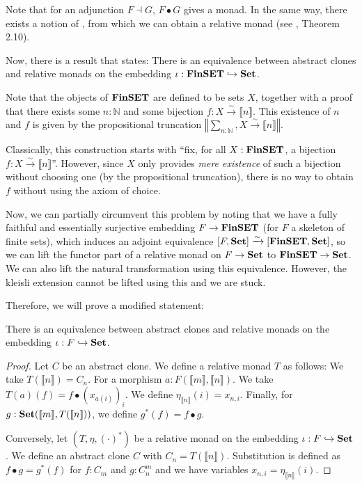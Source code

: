 \begin{remark}
  Note that for an adjunction $ F \dashv G $, $ F \bullet G $ gives a monad. In the same way, there exists a notion of , from which we can obtain a relative monad (see \autocite{monads-endofunctors}, Theorem 2.10).
\end{remark}

\begin{remark}
  Now, there is a result that states: There is an equivalence between abstract clones and relative monads on the embedding $ \iota: \mathbf{FinSET} \hookrightarrow \mathbf{Set} $.

  Note that the objects of $ \mathbf{FinSET} $ are defined to be sets $ X $, together with a proof that there exists some $ n: \mathbb N $ and some bijection $ f: X \xrightarrow{\sim} \llbracket n \rrbracket $. This existence of $ n $ and $ f $ is given by the propositional truncation $ \left\Vert \sum_{n: \mathbb N}, X \xrightarrow{\sim} \llbracket n \rrbracket \right\Vert $.

  Classically, this construction starts with ``fix, for all $ X : \mathbf{FinSET} $, a bijection $ f: X \xrightarrow{\sim} \llbracket n \rrbracket $''. However, since $ X $ only provides \textit{mere existence} of such a bijection without choosing one (by the propositional truncation), there is no way to obtain $ f $ without using the axiom of choice.

  Now, we can partially circumvent this problem by noting that we have a fully faithful and essentially surjective embedding $ F \to \mathbf{FinSET} $ (for $ F $ a skeleton of finite sets), which induces an adjoint equivalence $ [F, \mathbf{Set}] \xrightarrow{\sim} [\mathbf{FinSET}, \mathbf{Set}] $, so we can lift the functor part of a relative monad on $ F \to \mathbf{Set} $ to $ \mathbf{FinSET} \to \mathbf{Set} $. We can also lift the natural transformation using this equivalence. However, the kleisli extension cannot be lifted using this and we are stuck.

  Therefore, we will prove a modified statement:
\end{remark}

\begin{lemma}
  There is an equivalence between abstract clones and relative monads on the embedding $ \iota: F \hookrightarrow \mathbf{Set} $.
\end{lemma}
\begin{proof}
  Let $ C $ be an abstract clone. We define a relative monad $ T $ as follows: We take $ T(\llbracket n \rrbracket) = C_n $. For a morphism $ a: F(\llbracket m \rrbracket, \llbracket n \rrbracket) $. We take $ T(a)(f) = f \bullet (x_{a(i)})_i $. We define $ \eta_{\llbracket n \rrbracket}(i) = x_{n, i} $. Finally, for $ g: \mathbf{Set}(\llbracket m \rrbracket, T(\llbracket n \rrbracket)) $, we define $ g^*(f) = f \bullet g $.

  Conversely, let $ (T, \eta, (\cdot)^*) $ be a relative monad on the embedding $ \iota: F \hookrightarrow \mathbf{Set} $. We define an abstract clone $ C $ with $ C_n = T(\llbracket n \rrbracket) $. Substitution is defined as $ f \bullet g = g^*(f) $ for $ f: C_m $ and $ g: C_n^m $ and we have variables $ x_{n, i} = \eta_{\llbracket n \rrbracket}(i) $.
\end{proof}


